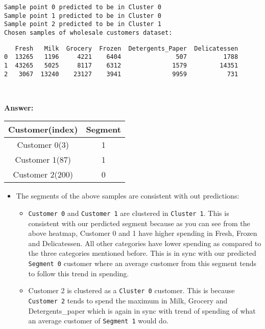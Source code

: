\documentclass[11pt]{article}
\providecommand{\tightlist}{%
      \setlength{\itemsep}{0pt}\setlength{\parskip}{0pt}}
\begin{document}
    \begin{Verbatim}[commandchars=\\\{\}]
Sample point 0 predicted to be in Cluster 0
Sample point 1 predicted to be in Cluster 0
Sample point 2 predicted to be in Cluster 1
Chosen samples of wholesale customers dataset:

    \end{Verbatim}

    
    \begin{verbatim}
   Fresh   Milk  Grocery  Frozen  Detergents_Paper  Delicatessen
0  13265   1196     4221    6404               507          1788
1  43265   5025     8117    6312              1579         14351
2   3067  13240    23127    3941              9959           731
    \end{verbatim}

    
    \begin{center}
    \end{center}
    { \hspace*{\fill} \\}
    
    \textbf{Answer:}

\begin{longtable}[]{@{}cc@{}}
\toprule
Customer(index) & Segment\tabularnewline
\midrule
\endhead
Customer 0(3) & 1\tabularnewline
Customer 1(87) & 1\tabularnewline
Customer 2(200) & 0\tabularnewline
\bottomrule
\end{longtable}

\begin{itemize}
\tightlist
\item
  The segments of the above samples are consistent with out predictions:

  \begin{itemize}
  \tightlist
  \item
    \texttt{Customer\ 0} and \texttt{Customer\ 1} are clustered in
    \texttt{Cluster\ 1}. This is consistent with our perdicted segment
    because as you can see from the above heatmap, Customer 0 and 1 have
    higher spending in Fresh, Frozen and Delicatessen. All other
    categories have lower spending as compared to the three categories
    mentioned before. This is in sync with our predicted
    \texttt{Segment\ 0} customer where an average customer from this
    segment tends to follow this trend in spending.
  \item
    Customer 2 is clustered as a \texttt{Cluster\ 0} customer. This is
    because \texttt{Customer\ 2} tends to spend the maximum in Milk,
    Grocery and Detergents\_paper which is again in sync with trend of
    spending of what an average customer of \texttt{Segment\ 1} would
    do.
  \end{itemize}
\end{itemize}
\end{document}

